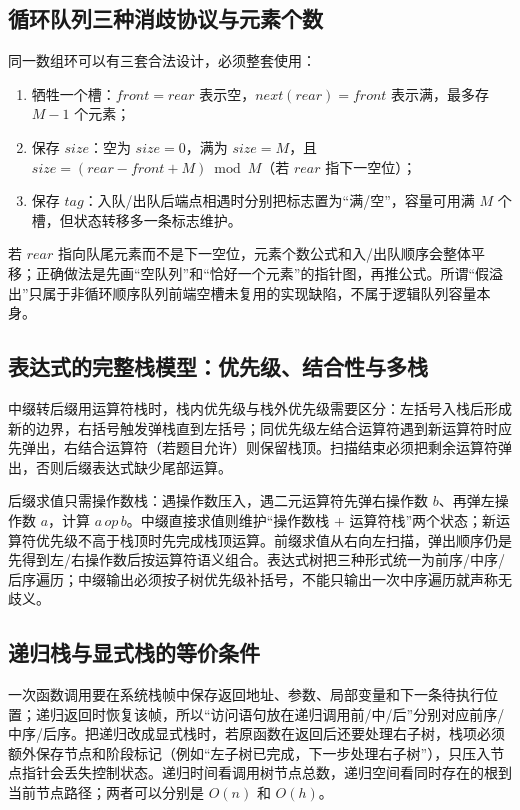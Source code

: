 \documentclass[UTF8,fontset=none,11pt,a4paper]{ctexart}
\begin{document}
\subsection{循环队列三种消歧协议与元素个数}
同一数组环可以有三套合法设计，必须整套使用：
\begin{enumerate}
\item 牺牲一个槽：$front=rear$ 表示空，$next(rear)=front$ 表示满，最多存 $M-1$ 个元素；
\item 保存 $size$：空为 $size=0$，满为 $size=M$，且 $size=(rear-front+M)\bmod M$（若 $rear$ 指下一空位）；
\item 保存 $tag$：入队/出队后端点相遇时分别把标志置为“满/空”，容量可用满 $M$ 个槽，但状态转移多一条标志维护。
\end{enumerate}
若 $rear$ 指向队尾元素而不是下一空位，元素个数公式和入/出队顺序会整体平移；正确做法是先画“空队列”和“恰好一个元素”的指针图，再推公式。所谓“假溢出”只属于非循环顺序队列前端空槽未复用的实现缺陷，不属于逻辑队列容量本身。

\subsection{表达式的完整栈模型：优先级、结合性与多栈}
中缀转后缀用运算符栈时，栈内优先级与栈外优先级需要区分：左括号入栈后形成新的边界，右括号触发弹栈直到左括号；同优先级左结合运算符遇到新运算符时应先弹出，右结合运算符（若题目允许）则保留栈顶。扫描结束必须把剩余运算符弹出，否则后缀表达式缺少尾部运算。

后缀求值只需操作数栈：遇操作数压入，遇二元运算符先弹右操作数 $b$、再弹左操作数 $a$，计算 $a\,op\,b$。中缀直接求值则维护“操作数栈 + 运算符栈”两个状态；新运算符优先级不高于栈顶时先完成栈顶运算。前缀求值从右向左扫描，弹出顺序仍是先得到左/右操作数后按运算符语义组合。表达式树把三种形式统一为前序/中序/后序遍历；中缀输出必须按子树优先级补括号，不能只输出一次中序遍历就声称无歧义。

\subsection{递归栈与显式栈的等价条件}
一次函数调用要在系统栈帧中保存返回地址、参数、局部变量和下一条待执行位置；递归返回时恢复该帧，所以“访问语句放在递归调用前/中/后”分别对应前序/中序/后序。把递归改成显式栈时，若原函数在返回后还要处理右子树，栈项必须额外保存节点和阶段标记（例如“左子树已完成，下一步处理右子树”），只压入节点指针会丢失控制状态。递归时间看调用树节点总数，递归空间看同时存在的根到当前节点路径；两者可以分别是 $O(n)$ 和 $O(h)$。
\end{document}
